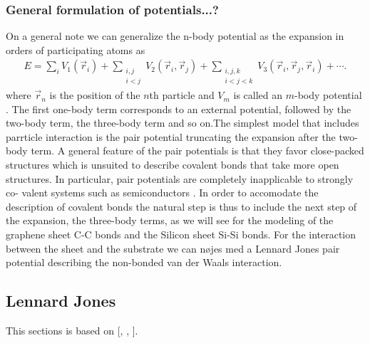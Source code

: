 \subsubsection{General formulation of potentials...?}

On a general note we can generalize the n-body potential as the expansion in orders of participating atoms as 
\begin{align*}
  E = \sum_i V_1(\vec{r}_i) + 
      \sum_{\substack{i, j \\ i < j}} V_2(\vec{r}_i, \vec{r}_j) +  
      \sum_{\substack{i,j,k \\ i < j < k}} V_3(\vec{r}_i, \vec{r}_j, \vec{r}_i) + \cdots.
\end{align*} 
where $\vec{r}_n$ is the position of the $n$th particle and $V_m$ is called an $m$-body potential  \cite{PhysRevB.37.6991}. The first
one-body term corresponds to an external potential, followed by the two-body term, the three-body term and so on.The simplest model that includes parrticle interaction is the pair potential truncating the expansion after the two-body term. A general feature of the pair potentials is that they favor close-packed structures which is unsuited to describe covalent bonds that take more open structures. In particular, pair potentials are completely inapplicable to strongly co- valent systems such as semiconductors \cite{PhysRevB.37.6991}. In order to accomodate the description of covalent bonds the natural step is thus to include the next step of the expansion, the three-body
terms, as we will see for the modeling of the graphene sheet C-C bonds and the Silicon sheet Si-Si bonds. For the interaction between the sheet and the substrate we can nøjes med a Lennard Jones pair potential describing the non-bonded van der Waals interaction.


\subsection{Lennard Jones}
This sections is based on [\cite{docs_lammps_LJ}, \cite{C9CP05445F}, \cite{chem_libretexts_LJ}].

